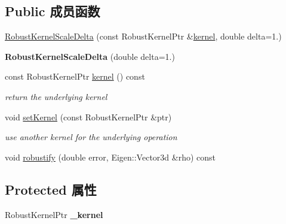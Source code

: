 \subsection*{Public 成员函数}
\begin{DoxyCompactItemize}
\item 
\hyperlink{classg2o_1_1RobustKernelScaleDelta_acffeae7f685e69018f5b0222155a6eb2}{Robust\-Kernel\-Scale\-Delta} (const Robust\-Kernel\-Ptr \&\hyperlink{classg2o_1_1RobustKernelScaleDelta_a84185732ac179a67e10995a657cebe59}{kernel}, double delta=1.)
\item 
\hypertarget{classg2o_1_1RobustKernelScaleDelta_a537a88b2ff5432fb9e1ad2aaa85f60b9}{{\bfseries Robust\-Kernel\-Scale\-Delta} (double delta=1.)}\label{classg2o_1_1RobustKernelScaleDelta_a537a88b2ff5432fb9e1ad2aaa85f60b9}

\item 
\hypertarget{classg2o_1_1RobustKernelScaleDelta_a84185732ac179a67e10995a657cebe59}{const Robust\-Kernel\-Ptr \hyperlink{classg2o_1_1RobustKernelScaleDelta_a84185732ac179a67e10995a657cebe59}{kernel} () const }\label{classg2o_1_1RobustKernelScaleDelta_a84185732ac179a67e10995a657cebe59}

\begin{DoxyCompactList}\small\item\em return the underlying kernel \end{DoxyCompactList}\item 
\hypertarget{classg2o_1_1RobustKernelScaleDelta_a3bcc51d0cf3127e8c0431d1cddc1c75b}{void \hyperlink{classg2o_1_1RobustKernelScaleDelta_a3bcc51d0cf3127e8c0431d1cddc1c75b}{set\-Kernel} (const Robust\-Kernel\-Ptr \&ptr)}\label{classg2o_1_1RobustKernelScaleDelta_a3bcc51d0cf3127e8c0431d1cddc1c75b}

\begin{DoxyCompactList}\small\item\em use another kernel for the underlying operation \end{DoxyCompactList}\item 
void \hyperlink{classg2o_1_1RobustKernelScaleDelta_aa0dd08d5175fac24ce96b1efe08be67b}{robustify} (double error, Eigen\-::\-Vector3d \&rho) const 
\end{DoxyCompactItemize}
\subsection*{Protected 属性}
\begin{DoxyCompactItemize}
\item 
\hypertarget{classg2o_1_1RobustKernelScaleDelta_a4a2976cb5f12553f0e00dfdf239b1231}{Robust\-Kernel\-Ptr {\bfseries \-\_\-kernel}}\label{classg2o_1_1RobustKernelScaleDelta_a4a2976cb5f12553f0e00dfdf239b1231}

\end{DoxyCompactItemize}


